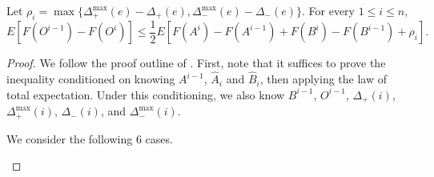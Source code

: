 \begin{lem}\label{lem:singleelement}
Let $\rho_i = \max\{\Delta_+^{\max}(e) - \Delta_+(e), \Delta_-^{\max}(e) - \Delta_-(e)\}$.
For every $1 \leq i \leq n$,
\[E[F(O^{i-1})-F(O^i)] \leq \frac{1}{2} E[F(A^i) - F(A^{i-1}) + F(B^i) - F(B^{i-1}) + \rho_i].\]
\end{lem}
\begin{proof}
We follow the proof outline of \cite{buchbinder2012}.
First, note that it suffices to prove the inequality conditioned on knowing $A^{i-1}$, $\hat{A}_i$ and $\hat{B}_i$, then applying the law of total expectation.
Under this conditioning, we also know $B^{i-1}$, $O^{i-1}$, $\Delta_+(i)$, $\Delta_+^{\max}(i)$, $\Delta_-(i)$, and $\Delta_-^{\max}(i)$.



We consider the following 6 cases.


\begin{description}


\end{description}
\end{proof}
